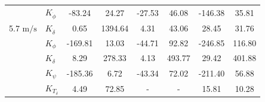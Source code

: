 \begin{table}[]
\begin{tabular}{llcccccc}
                                                   & $K_{\dot{\phi}} $                                      & -83.24                                      & 24.27                                                & -27.53                                      & 46.08                                                & -146.38                                     & 35.81                                                \\
    \multirow{-2}{*}{5.7 $\si{\meter\per\second}$} & $K_{\dot{\delta}}$                                     & 0.65                                        & 1394.64                                              & 4.31                                        & 43.06                                                & 28.45                                       & 31.76                                                \\
                                                   & $K_{\phi} $                                            & -169.81                                     & 13.03                                                & -44.71                                      & 92.82                                                & -246.85                                     & 116.80                                               \\
                                                   & $K_\delta $                                            & 8.29                                        & 278.33                                               & 4.13                                        & 493.77                                               & 29.42                                       & 401.88                                               \\
                                                   & $K_\psi $                                              & -185.36                                     & 6.72                                                 & -43.34                                      & 72.02                                                & -211.40                                     & 56.88                                                \\
                                                   & $K_{T_\delta}$                                         & 4.49                                        & 72.85                                                & -                                           & -                                                    & 15.81                                       & 10.28                                                \\ \cline{2-8} 

\end{tabular}
\end{table}
